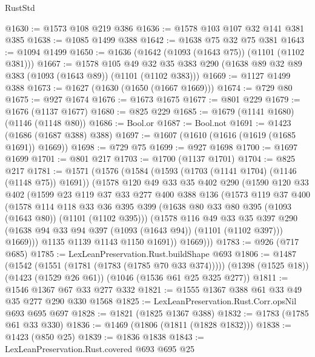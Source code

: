 \begin{lexlean}{RustStd}
\begin{coremodule}
{\begin{coremodule}
{{{{{{{{@1630 := @1573 @108 @219 @386
@1636 := @1578 @103 @107 @32 @141 @381 @385
@1638 := @1085 @1499 @388
@1642 := @1638 @75 @32 @75 @381
@1643 := @1094 @1499
@1650 := @1636 (@1642 (@1093 (@1643 @75)) (@1101 (@1102 @381)))
@1667 := @1578
    @105
    @49
    @32
    @35
    @383
    @290
    (@1638 @89 @32 @89 @383 (@1093 (@1643 @89)) (@1101 (@1102 @383)))
@1669 := @1127 @1499 @388
@1673 := @1627 (@1630 (@1650 (@1667 @1669)))
@1674 := @729 @80
@1675 := @927 @1674
@1676 := @1673 @1675
@1677 := @801 @229
@1679 := @1676 (@1137 @1677)
@1680 := @825 @229
@1685 := @1679 (@1141 @1680) (@1146 (@1148 @80))
@1686 := Bool.or
@1687 := Bool.not
@1691 := @1423 (@1686 (@1687 @388) @388)
@1697 := @1607 (@1610 (@1616 (@1619 (@1685 @1691)) @1669))
@1698 := @729 @75
@1699 := @927 @1698
@1700 := @1697 @1699
@1701 := @801 @217
@1703 := @1700 (@1137 @1701)
@1704 := @825 @217
@1781 := @1571
    (@1576
      (@1584
        (@1593 (@1703 (@1141 @1704) (@1146 (@1148 @75)) @1691))
        (@1578
          @120
          @49
          @33
          @35
          @402
          @290
          (@1590
            @120
            @33
            @402
            (@1599
              @23
              @119
              @37
              @33
              @277
              @400
              @388
              @136
              (@1573
                @119
                @37
                @400
                (@1578
                  @114
                  @118
                  @33
                  @36
                  @395
                  @399
                  (@1638 @80 @33 @80 @395 (@1093 (@1643 @80)) (@1101 (@1102 @395)))
                  (@1578
                    @116
                    @49
                    @33
                    @35
                    @397
                    @290
                    (@1638 @94 @33 @94 @397 (@1093 (@1643 @94)) (@1101 (@1102 @397)))
                    @1669)))
              @1135
              @1139
              @1143
              @1150
              @1691))
          @1669)))
@1783 := @926 (@717 @685)
@1785 := LexLeanPreservation.Rust.buildShape @693
@1806 := @1487
    (@1542 (@1551 (@1781 (@1783 (@1785 @70 @33 @374)))))
    (@1398 (@1525 @18))
    (@1423 (@1529 @26 @61))
    (@1046 (@1536 @61 @25 @325 @277))
@1811 := @1546 @1367 @67 @33 @277 @332
@1821 := @1555 @1367 @388 @61 @33 @49 @35 @277 @290 @330 @1568
@1825 := LexLeanPreservation.Rust.Corr.opsNil @693 @695 @697
@1828 := @1821 (@1825 @1367 @388)
@1832 := @1783 (@1785 @61 @33 @330)
@1836 := @1469 (@1806 (@1811 (@1828 @1832)))
@1838 := @1423 (@850 @25)
@1839 := @1836 @1838
@1843 := LexLeanPreservation.Rust.covered @693 @695 @25
}}}}}}}}
\end{coremodule}}
\end{coremodule}
\end{lexlean}

